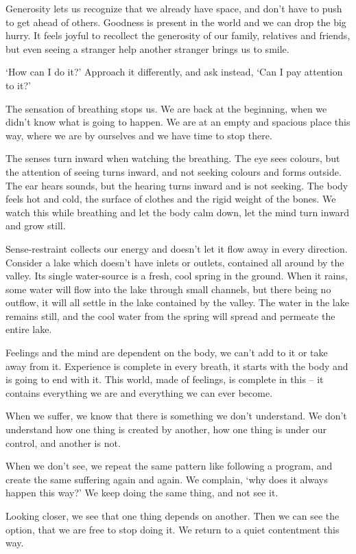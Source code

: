 Generosity lets us recognize that we already have space, and don't have
to push to get ahead of others. Goodness is present in the world and we
can drop the big hurry. It feels joyful to recollect the generosity of
our family, relatives and friends, but even seeing a stranger help
another stranger brings us to smile.

`How can I do it?' Approach it differently, and ask instead, `Can I pay
attention to it?'

The sensation of breathing stops us. We are back at the beginning, when
we didn't know what is going to happen. We are at an empty and spacious
place this way, where we are by ourselves and we have time to stop
there.

The senses turn inward when watching the breathing. The eye sees
colours, but the attention of seeing turns inward, and not seeking
colours and forms outside. The ear hears sounds, but the hearing turns
inward and is not seeking. The body feels hot and cold, the surface of
clothes and the rigid weight of the bones. We watch this while breathing
and let the body calm down, let the mind turn inward and grow still.

Sense-restraint collects our energy and doesn't let it flow away in
every direction. Consider a lake which doesn't have inlets or outlets,
contained all around by the valley. Its single water-source is a fresh,
cool spring in the ground. When it rains, some water will flow into the
lake through small channels, but there being no outflow, it will all
settle in the lake contained by the valley. The water in the lake
remains still, and the cool water from the spring will spread and
permeate the entire lake.

Feelings and the mind are dependent on the body, we can't add to it or
take away from it. Experience is complete in every breath, it starts
with the body and is going to end with it. This world, made of feelings,
is complete in this -- it contains everything we are and everything we
can ever become.

When we suffer, we know that there is something we don't understand. We
don't understand how one thing is created by another, how one thing is
under our control, and another is not.

When we don't see, we repeat the same pattern like following a program,
and create the same suffering again and again. We complain, `why does it
always happen this way?' We keep doing the same thing, and not see it.

Looking closer, we see that one thing depends on another. Then we can
see the option, that we are free to stop doing it. We return to a quiet
contentment this way.

